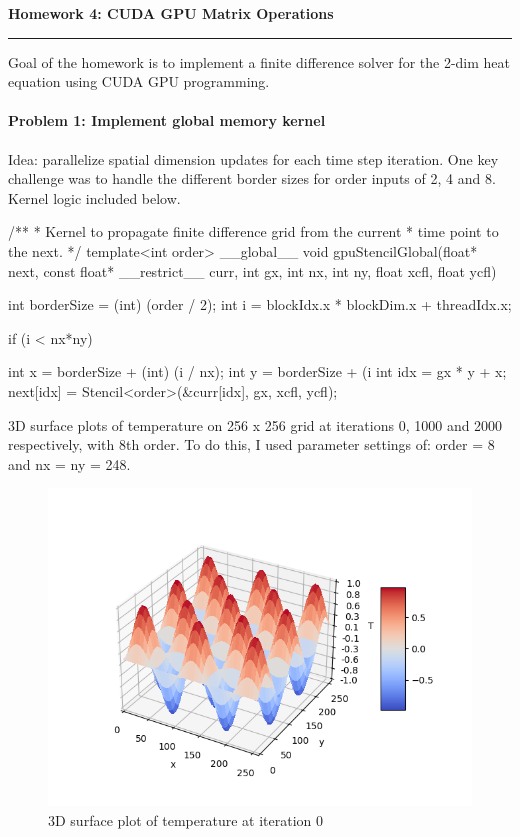 \documentclass[12pt,letterpaper,twoside]{article}
\begin{document}
{\centering \textbf{Homework 4: CUDA GPU Matrix Operations\\}}
\vspace*{-8pt}\noindent\rule{\linewidth}{1pt}

Goal of the homework is to implement a finite difference solver for the
2-dim heat equation using CUDA GPU programming.

\paragraph{Problem 1: Implement global memory kernel } Idea: parallelize spatial
dimension updates for each time step iteration. One key challenge was to handle
the different border sizes for order inputs of 2, 4 and 8. Kernel logic included
below.

\begin{cpp}
/**
 * Kernel to propagate finite difference grid from the current
 * time point to the next.
 */
template<int order>
__global__
void gpuStencilGlobal(float* next, const float* __restrict__ curr, 
                      int gx, int nx, int ny, float xcfl, float ycfl) {
    
    int borderSize = (int) (order / 2);
    int i = blockIdx.x * blockDim.x + threadIdx.x;
   
    if (i < nx*ny) {
	int x = borderSize + (int) (i / nx);
	int y = borderSize + (i %
        int idx = gx * y + x;   
        next[idx] = Stencil<order>(&curr[idx], gx, xcfl, ycfl);
    
    }
}
\end{cpp}

3D surface plots of temperature on 256 x 256 grid at iterations 0, 1000 and 
2000 respectively, with 8th order. To do this, I used parameter settings of:
order = 8 and nx = ny = 248.

\begin{figure}[h]
    \center
    \includegraphics[scale=0.7]{global_0000.png}
    \caption{3D surface plot of temperature at iteration 0}
\end{figure}
\end{document}
